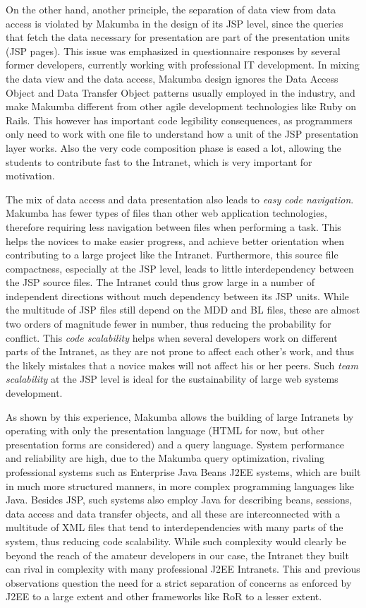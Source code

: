 \documentclass{chi2009}
\begin{document}
On the other hand, another principle, the separation of data view from data access is violated by Makumba in the design of its JSP level, since the queries that fetch the data necessary for presentation are part of the presentation units (JSP pages). This issue was emphasized in questionnaire responses by several former developers, currently working with professional IT development. In mixing the data view and the data access, Makumba design ignores the Data Access Object and Data Transfer Object patterns usually employed in the industry, and make Makumba different from other agile development technologies like Ruby on Rails. This however has important code legibility consequences, as programmers only need to work with one file to understand how a unit of the JSP presentation layer works. Also the very code composition phase is eased a lot, allowing the students to contribute fast to the Intranet, which is very important for motivation. 

The mix of data access and data presentation also leads to \textit{easy code navigation}.  Makumba has fewer types of files than other web application technologies, therefore requiring less navigation between files when performing a task. This helps the novices to make easier progress, and achieve better orientation when contributing to a large project like the Intranet. Furthermore, this source file compactness, especially at the JSP level, leads to little interdependency between the JSP source files. The Intranet could thus grow large in a number of independent directions without much dependency between its JSP units. While the multitude of JSP files still depend on the MDD and BL files, these are almost two orders of magnitude fewer in number, thus reducing the probability for conflict. This \textit{code scalability}  helps when several developers work on different parts of the Intranet, as they are not prone to affect each other's work, and thus the likely mistakes that a novice makes will not affect his or her peers. Such \textit{team scalability} at the JSP level is ideal for the sustainability of large web systems development.

As shown by this experience, Makumba allows the building of large Intranets by operating with only the presentation language (HTML for now, but other presentation forms are considered) and a query language. System performance and reliability are high, due to the Makumba query optimization, rivaling professional systems such as Enterprise Java Beans J2EE systems,  which are built in much more structured manners, in more complex programming languages like Java.  Besides JSP, such systems also employ Java for describing beans, sessions, data access and data transfer objects, and all these are interconnected with a multitude of XML files that tend to interdependencies with many parts of the system, thus reducing code scalability. While such complexity would clearly be beyond the reach of the amateur developers in our case, the Intranet they built can rival in complexity with many professional J2EE Intranets. This and previous observations question the need for a strict separation of concerns as enforced by J2EE to a large extent and other frameworks like RoR to a lesser extent.
\end{document}
